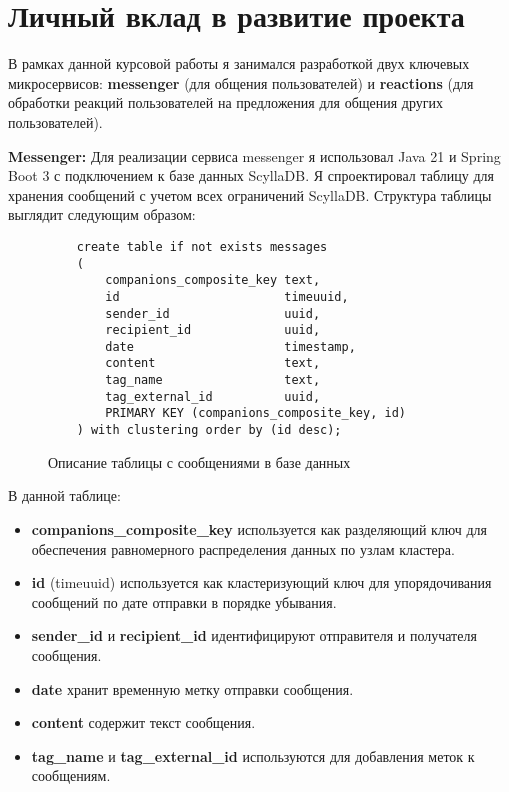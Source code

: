\section{Личный вклад в развитие проекта}

В рамках данной курсовой работы я занимался разработкой двух ключевых микросервисов: \textbf{messenger} (для общения пользователей) и \textbf{reactions} (для обработки реакций пользователей на предложения для общения других пользователей).

\textbf{Messenger:} 
Для реализации сервиса messenger я использовал Java 21 и Spring Boot 3 с подключением к базе данных ScyllaDB. Я спроектировал таблицу для хранения сообщений с учетом всех ограничений ScyllaDB. Структура таблицы выглядит следующим образом:

\begin{figure}[h]
    \begin{verbatim}
    create table if not exists messages
    (
        companions_composite_key text,
        id                       timeuuid,
        sender_id                uuid,
        recipient_id             uuid,
        date                     timestamp,
        content                  text,
        tag_name                 text,
        tag_external_id          uuid,
        PRIMARY KEY (companions_composite_key, id)
    ) with clustering order by (id desc);
    \end{verbatim}
    \caption{Описание таблицы с сообщениями в базе данных}
\end{figure}

В данной таблице:
\begin{itemize}
    \item \textbf{companions\_composite\_key} используется как разделяющий ключ для обеспечения равномерного распределения данных по узлам кластера.
    \item \textbf{id} (timeuuid) используется как кластеризующий ключ для упорядочивания сообщений по дате отправки в порядке убывания.
    \item \textbf{sender\_id} и \textbf{recipient\_id} идентифицируют отправителя и получателя сообщения.
    \item \textbf{date} хранит временную метку отправки сообщения.
    \item \textbf{content} содержит текст сообщения.
    \item \textbf{tag\_name} и \textbf{tag\_external\_id} используются для добавления меток к сообщениям.
\end{itemize}


